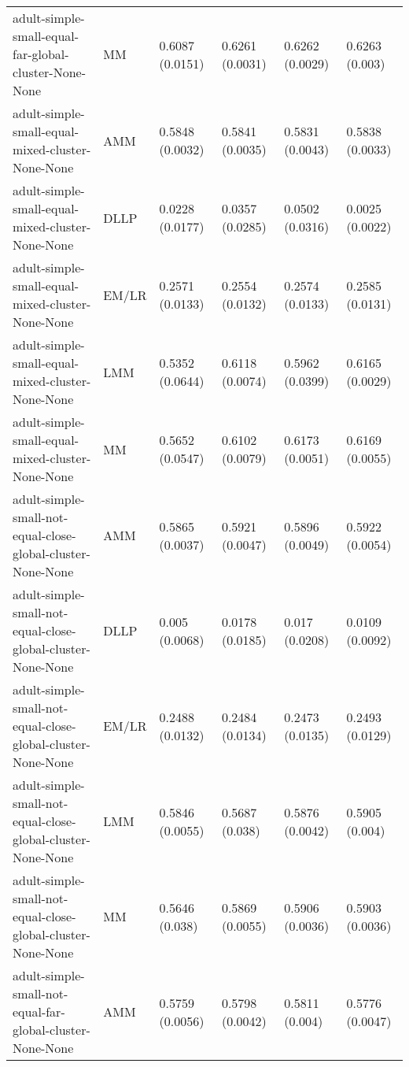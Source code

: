 \begin{tabular}{llllll}
                                  adult-simple-small-equal-far-global-cluster-None-None &        MM & 0.6087 (0.0151) &  0.6261 (0.0031) &   0.6262 (0.0029) &      0.6263 (0.003) \\
                                       adult-simple-small-equal-mixed-cluster-None-None &       AMM & 0.5848 (0.0032) &  0.5841 (0.0035) &   0.5831 (0.0043) &     0.5838 (0.0033) \\
                                       adult-simple-small-equal-mixed-cluster-None-None &      DLLP & 0.0228 (0.0177) &  0.0357 (0.0285) &   0.0502 (0.0316) &     0.0025 (0.0022) \\
                                       adult-simple-small-equal-mixed-cluster-None-None &     EM/LR & 0.2571 (0.0133) &  0.2554 (0.0132) &   0.2574 (0.0133) &     0.2585 (0.0131) \\
                                       adult-simple-small-equal-mixed-cluster-None-None &       LMM & 0.5352 (0.0644) &  0.6118 (0.0074) &   0.5962 (0.0399) &     0.6165 (0.0029) \\
                                       adult-simple-small-equal-mixed-cluster-None-None &        MM & 0.5652 (0.0547) &  0.6102 (0.0079) &   0.6173 (0.0051) &     0.6169 (0.0055) \\
                            adult-simple-small-not-equal-close-global-cluster-None-None &       AMM & 0.5865 (0.0037) &  0.5921 (0.0047) &   0.5896 (0.0049) &     0.5922 (0.0054) \\
                            adult-simple-small-not-equal-close-global-cluster-None-None &      DLLP &  0.005 (0.0068) &  0.0178 (0.0185) &    0.017 (0.0208) &     0.0109 (0.0092) \\
                            adult-simple-small-not-equal-close-global-cluster-None-None &     EM/LR & 0.2488 (0.0132) &  0.2484 (0.0134) &   0.2473 (0.0135) &     0.2493 (0.0129) \\
                            adult-simple-small-not-equal-close-global-cluster-None-None &       LMM & 0.5846 (0.0055) &   0.5687 (0.038) &   0.5876 (0.0042) &      0.5905 (0.004) \\
                            adult-simple-small-not-equal-close-global-cluster-None-None &        MM &  0.5646 (0.038) &  0.5869 (0.0055) &   0.5906 (0.0036) &     0.5903 (0.0036) \\
                              adult-simple-small-not-equal-far-global-cluster-None-None &       AMM & 0.5759 (0.0056) &  0.5798 (0.0042) &    0.5811 (0.004) &     0.5776 (0.0047) \\

\end{tabular}
